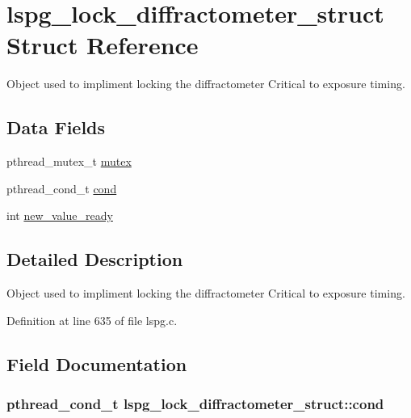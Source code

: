 \hypertarget{structlspg__lock__diffractometer__struct}{\section{lspg\-\_\-lock\-\_\-diffractometer\-\_\-struct Struct Reference}
\label{structlspg__lock__diffractometer__struct}
}


Object used to impliment locking the diffractometer Critical to exposure timing.  


\subsection*{Data Fields}
\begin{DoxyCompactItemize}
\item 
pthread\-\_\-mutex\-\_\-t \hyperlink{structlspg__lock__diffractometer__struct_a362e848dfd1551428b8d12d8776fd2ed}{mutex}
\item 
pthread\-\_\-cond\-\_\-t \hyperlink{structlspg__lock__diffractometer__struct_a7614c802af37c1d3358479a2c13ac898}{cond}
\item 
int \hyperlink{structlspg__lock__diffractometer__struct_ae94acdf44008ce48930e3083f08f5b6c}{new\-\_\-value\-\_\-ready}
\end{DoxyCompactItemize}


\subsection{Detailed Description}
Object used to impliment locking the diffractometer Critical to exposure timing. 

Definition at line 635 of file lspg.\-c.



\subsection{Field Documentation}
\hypertarget{structlspg__lock__diffractometer__struct_a7614c802af37c1d3358479a2c13ac898}{
\subsubsection[{cond}]{\setlength{\rightskip}{0pt plus 5cm}pthread\-\_\-cond\-\_\-t lspg\-\_\-lock\-\_\-diffractometer\-\_\-struct\-::cond}}\label{structlspg__lock__diffractometer__struct_a7614c802af37c1d3358479a2c13ac898}


